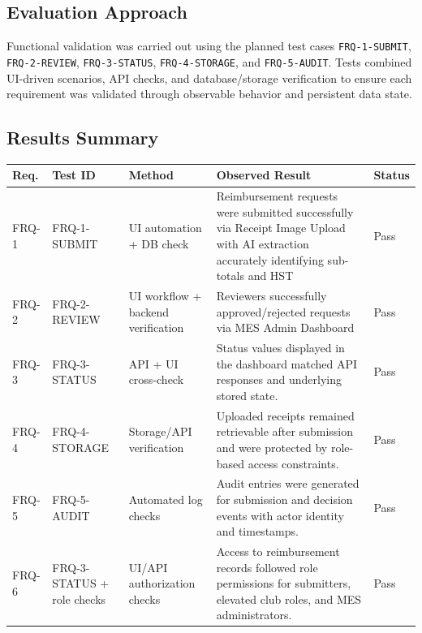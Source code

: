 \documentclass[12pt, titlepage]{article}
\begin{document}
\subsection{Evaluation Approach}

Functional validation was carried out using the planned test cases
\texttt{FRQ-1-SUBMIT}, \texttt{FRQ-2-REVIEW}, \texttt{FRQ-3-STATUS},
\texttt{FRQ-4-STORAGE}, and \texttt{FRQ-5-AUDIT}. Tests combined UI-driven
scenarios, API checks, and database/storage verification to ensure each
requirement was validated through observable behavior and persistent data state.

\subsection{Results Summary}

\renewcommand{\arraystretch}{1.2}
\begin{tabularx}{\textwidth}{>{\raggedright\arraybackslash}p{1.8cm} >{\raggedright\arraybackslash}p{2.0cm} >{\raggedright\arraybackslash}p{2.2cm} X >{\raggedright\arraybackslash}p{1.6cm}}
\toprule
\textbf{Req.} & \textbf{Test ID} & \textbf{Method} & \textbf{Observed Result} & \textbf{Status}\\
\midrule
FRQ-1 & FRQ-1-SUBMIT & UI automation + DB check & Reimbursement requests were submitted successfully via Receipt Image Upload with AI extraction accurately identifying sub-totals and HST & Pass\\
FRQ-2 & FRQ-2-REVIEW & UI workflow + backend verification & Reviewers successfully approved/rejected requests via MES Admin Dashboard & Pass\\
FRQ-3 & FRQ-3-STATUS & API + UI cross-check & Status values displayed in the dashboard matched API responses and underlying stored state. & Pass\\
FRQ-4 & FRQ-4-STORAGE & Storage/API verification & Uploaded receipts remained retrievable after submission and were protected by role-based access constraints. & Pass\\
FRQ-5 & FRQ-5-AUDIT & Automated log checks & Audit entries were generated for submission and decision events with actor identity and timestamps. & Pass\\
FRQ-6 & FRQ-3-STATUS + role checks & UI/API authorization checks & Access to reimbursement records followed role permissions for submitters, elevated club roles, and MES administrators. & Pass\\
\bottomrule
\end{tabularx}
\end{document}
